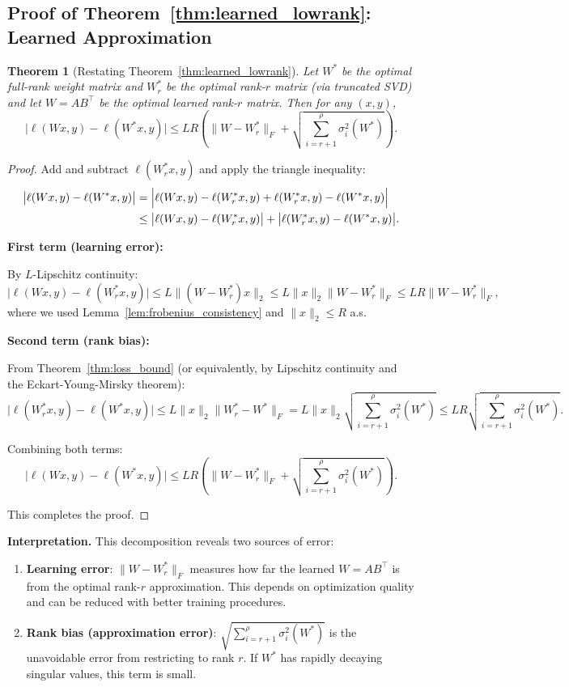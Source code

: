 \documentclass{article}
\theoremstyle{plain}
\newtheorem{theorem}{Theorem}[section]
\theoremstyle{definition}
\theoremstyle{remark}
\begin{document}
\subsection{Proof of Theorem~\ref{thm:learned_lowrank}: Learned Approximation}\label{app:learned_loss_proof}

\begin{theorem}[Restating Theorem~\ref{thm:learned_lowrank}]
Let $W^*$ be the optimal full-rank weight matrix and $W^*_r$ be the optimal rank-$r$ matrix (via truncated SVD) and let $W = AB^\top$ be the optimal learned rank-$r$ matrix. Then for any $(x,y)$,
\[
\bigl|\ell(Wx, y) - \ell(W^*x, y)\bigr| 
\leq LR\left(\|W - W^*_r\|_F + \sqrt{\sum_{i=r+1}^{\rho}\sigma_i^2(W^*)}\right).
\]
\end{theorem}

\begin{proof}
Add and subtract $\ell(W^*_r x,y)$ and apply the triangle inequality:
\begin{align*}
\bigl|\ell(Wx,y) - \ell(W^*x,y)\bigr|
&= \Bigl|\ell(Wx,y) - \ell(W^*_r x,y) + \ell(W^*_r x,y) - \ell(W^*x,y)\Bigr| \\
&\leq \bigl|\ell(Wx,y) - \ell(W^*_r x,y)\bigr|
   + \bigl|\ell(W^*_r x,y) - \ell(W^*x,y)\bigr|.
\end{align*}

\textbf{First term (learning error):}

By $L$-Lipschitz continuity:
\[
\bigl|\ell(Wx,y) - \ell(W^*_r x,y)\bigr|
\leq L\|(W - W^*_r)x\|_2
\leq L\|x\|_2 \|W - W^*_r\|_F
\leq LR\|W - W^*_r\|_F,
\]
where we used Lemma~\ref{lem:frobenius_consistency} and $\|x\|_2 \leq R$ a.s.

\textbf{Second term (rank bias):}

From Theorem~\ref{thm:loss_bound} (or equivalently, by Lipschitz continuity and the Eckart-Young-Mirsky theorem):
\[
\bigl|\ell(W^*_r x,y) - \ell(W^*x,y)\bigr|
\leq L\|x\|_2 \|W^*_r - W^*\|_F
= L\|x\|_2 \sqrt{\sum_{i=r+1}^{\rho} \sigma_i^2(W^*)}
\leq LR\sqrt{\sum_{i=r+1}^{\rho} \sigma_i^2(W^*)}.
\]

Combining both terms:
\[
\bigl|\ell(Wx, y) - \ell(W^*x, y)\bigr| 
\leq LR\left(\|W - W^*_r\|_F + \sqrt{\sum_{i=r+1}^{\rho}\sigma_i^2(W^*)}\right).
\]

This completes the proof.
\end{proof}

\textbf{Interpretation.} This decomposition reveals two sources of error:
\begin{enumerate}
    \item \textbf{Learning error}: $\|W - W^*_r\|_F$ measures how far the learned $W = AB^\top$ is from the optimal rank-$r$ approximation. This depends on optimization quality and can be reduced with better training procedures.
    
    \item \textbf{Rank bias (approximation error)}: $\sqrt{\sum_{i=r+1}^{\rho} \sigma_i^2(W^*)}$ is the unavoidable error from restricting to rank $r$. If $W^*$ has rapidly decaying singular values, this term is small.
\end{enumerate}
\end{document}
